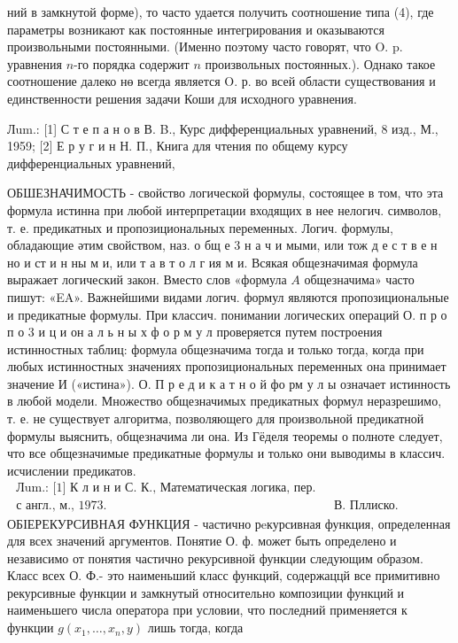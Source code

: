 \documentclass[10pt]{article}
\begin{document}
ний в замкнутой форме), то часто удается получить соотношение типа (4), где параметры возникают как постоянные интегрирования и оказываются произвольными постоянными. (Именно поэтому часто говорят, что O. p. уравнения $n$-го порядка содержит $n$ произвольных постоянных.). Однако такое соотношение далеко нө всегда является O. р. во всей области существования и единственности решения задачи Коши для исходного уравнения.



Лum.: [1] С т е п а н о в В. B., Курс дифференциальных уравнений, 8 изд., М., 1959; [2] Е р у г и н Н. П., Книга для чтения по общему курсу дифференциальных уравнений,



ОБШЕЗНАЧИМОСТЬ - свойство логической формулы, состоящее в том, что эта формула истинна при любой интерпретации входящих в нее нелогич. символов, т. е. предикатных и пропозициональных переменных. Логич. формулы, обладающие әтим свойством, наз. о бщ е 3 н а ч и мыми, или тож д е с т в е н но и ст и н ны м и, или т а в т о л г ия м и. Всякая общезначимая формула выражает логический закон. Вместо слов «формула $A$ общезначима» часто пишут: «EA». Важнейшими видами логич. формул являются пропозициональные и предикатные формулы. При классич. понимании логических операций О. п р о п о 3 и ц и он а л ь н ы х ф о р м у л проверяется путем построения истинностных таблиц: формула общезначима тогда и только тогда, когда при любых истинностных значениях пропозициональных переменных она принимает значение И («истина»). О. П р е д и к а т н о й фо рм у л ы означает истинность в любой модели. Множество общезначимых предикатных формул неразрешимо, т. е. не существует алгоритма, позволяющего для произвольной предикатной формулы выяснить, общезначима ли она. Из Гёделя теоремы о полноте следует, что все общезначимые предикатные формулы и только они выводимы в классич. исчислении предикатов. $\begin{array}{ll}\text { Лum.: [1] К л и н и С. К., Математическая логика, пер. } \\ \text { с англ., м., 1973. } & \text { В. Пллиско. }\end{array}$ ОБІЕРЕКУРСИВНАЯ ФУНКЦИЯ - частично рeкурсивная функция, определенная для всех значений аргументов. Понятие О. ф. может быть определено и независимо от понятия частично рекурсивной функции следующим образом. Класс всех О. Ф.- это наименьший класс функций, содержаццй все примитивно рекурсивные функции и замкнутый относительно композиции функций и наименьшего числа оператора при условии, что последний применяется к функции $g\left(x_{1}, \ldots, x_{n}, y\right)$ лишь тогда, когда
\end{document}
